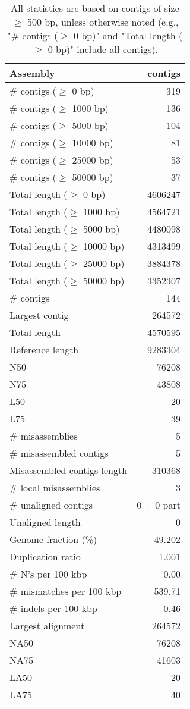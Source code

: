 \documentclass[12pt,a4paper]{article}
\begin{document}
\begin{table}[ht]
\begin{center}
\caption{All statistics are based on contigs of size $\geq$ 500 bp, unless otherwise noted (e.g., "\# contigs ($\geq$ 0 bp)" and "Total length ($\geq$ 0 bp)" include all contigs).}
\begin{tabular}{|l*{1}{|r}|}
\hline
Assembly & contigs \\ \hline
\# contigs ($\geq$ 0 bp) & 319 \\ \hline
\# contigs ($\geq$ 1000 bp) & 136 \\ \hline
\# contigs ($\geq$ 5000 bp) & 104 \\ \hline
\# contigs ($\geq$ 10000 bp) & 81 \\ \hline
\# contigs ($\geq$ 25000 bp) & 53 \\ \hline
\# contigs ($\geq$ 50000 bp) & 37 \\ \hline
Total length ($\geq$ 0 bp) & 4606247 \\ \hline
Total length ($\geq$ 1000 bp) & 4564721 \\ \hline
Total length ($\geq$ 5000 bp) & 4480098 \\ \hline
Total length ($\geq$ 10000 bp) & 4313499 \\ \hline
Total length ($\geq$ 25000 bp) & 3884378 \\ \hline
Total length ($\geq$ 50000 bp) & 3352307 \\ \hline
\# contigs & 144 \\ \hline
Largest contig & 264572 \\ \hline
Total length & 4570595 \\ \hline
Reference length & 9283304 \\ \hline
N50 & 76208 \\ \hline
N75 & 43808 \\ \hline
L50 & 20 \\ \hline
L75 & 39 \\ \hline
\# misassemblies & 5 \\ \hline
\# misassembled contigs & 5 \\ \hline
Misassembled contigs length & 310368 \\ \hline
\# local misassemblies & 3 \\ \hline
\# unaligned contigs & 0 + 0 part \\ \hline
Unaligned length & 0 \\ \hline
Genome fraction (\%) & 49.202 \\ \hline
Duplication ratio & 1.001 \\ \hline
\# N's per 100 kbp & 0.00 \\ \hline
\# mismatches per 100 kbp & 539.71 \\ \hline
\# indels per 100 kbp & 0.46 \\ \hline
Largest alignment & 264572 \\ \hline
NA50 & 76208 \\ \hline
NA75 & 41603 \\ \hline
LA50 & 20 \\ \hline
LA75 & 40 \\ \hline
\end{tabular}
\end{center}
\end{table}
\end{document}
